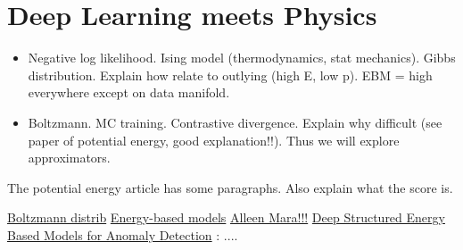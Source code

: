 \section{Deep Learning meets Physics}\label{sec:ebm}
\begin{itemize}
\item Negative log likelihood. Ising model (thermodynamics, stat mechanics). Gibbs distribution. Explain how relate to outlying (high E, low p). EBM = high everywhere except on data manifold.
\item Boltzmann. MC training. Contrastive divergence. Explain why difficult (see paper of potential energy, good explanation!!). Thus we will explore approximators.
\end{itemize}

The potential energy article has some paragraphs. Also explain what the score is. 

\href{https://www.lapasserelle.com/statistical_mechanics/lesson_4.pdf}{Boltzmann distrib}
\href{http://citeseerx.ist.psu.edu/viewdoc/download?doi=10.1.1.441.2811&rep=rep1&type=pdf}{Energy-based models}
\href{https://www.aliannajmaren.com/category/machine-learning/energy-based-models/}{Alleen Mara!!!}
\href{https://arxiv.org/abs/1605.07717}{Deep Structured Energy Based Models for Anomaly Detection} \citep{anomaly-detection-energy}: ....